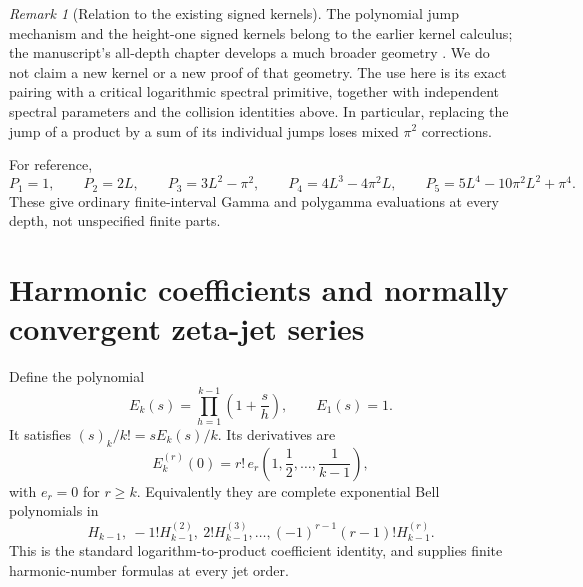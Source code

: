 \documentclass[11pt]{article}
\numberwithin{equation}{section}
\theoremstyle{definition}\newtheorem{definition}[theorem]{Definition}
\theoremstyle{remark}\newtheorem{remark}[theorem]{Remark}
\begin{document}
\begin{remark}[Relation to the existing signed kernels]
The polynomial jump mechanism and the height-one signed kernels belong to the earlier kernel calculus; the manuscript's all-depth chapter develops a much broader geometry \cite{kernels}. We do not claim a new kernel or a new proof of that geometry. The use here is its exact pairing with a critical logarithmic spectral primitive, together with independent spectral parameters and the collision identities above. In particular, replacing the jump of a product by a sum of its individual jumps loses mixed $\pi^2$ corrections.
\end{remark}

For reference,
\[
 P_1=1,\qquad P_2=2L,\qquad P_3=3L^2-\pi^2,\qquad
 P_4=4L^3-4\pi^2L,\qquad P_5=5L^4-10\pi^2L^2+\pi^4.
\]
These give ordinary finite-interval Gamma and polygamma evaluations at every depth, not unspecified finite parts.

\section{Harmonic coefficients and normally convergent zeta-jet series}
Define the polynomial
\begin{equation}\label{eq:Pk}
 E_k(s)=\prod_{h=1}^{k-1}\left(1+\frac{s}{h}\right),\qquad E_1(s)=1.
\end{equation}
It satisfies $(s)_k/k!=sE_k(s)/k$. Its derivatives are
\begin{equation}\label{eq:Ekderiv}
 E_k^{(r)}(0)=r!\,e_r\left(1,\frac12,\ldots,\frac1{k-1}\right),
\end{equation}
with $e_r=0$ for $r\ge k$. Equivalently they are complete exponential Bell polynomials in
\[
 H_{k-1},\ -1!H_{k-1}^{(2)},\ 2!H_{k-1}^{(3)},\ldots,
 (-1)^{r-1}(r-1)!H_{k-1}^{(r)}.
\]
This is the standard logarithm-to-product coefficient identity, and supplies finite harmonic-number formulas at every jet order.
\end{document}
